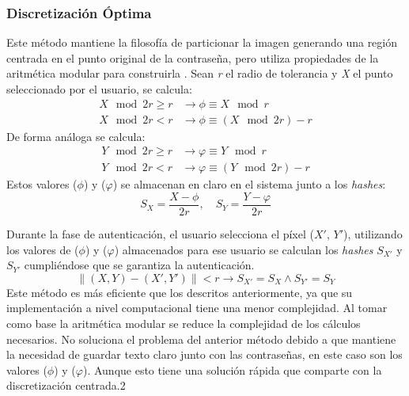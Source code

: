 \subsubsection{Discretización Óptima}
	
Este método mantiene la filosofía de particionar la imagen generando una región centrada en el punto original de la contraseña, pero utiliza propiedades de la aritmética modular para construirla \cite{bicakci2008optimal}. Sean \textit{r} el radio de tolerancia y \textit{X} el punto seleccionado por el usuario, se calcula:
\begin{equation}
	\begin{aligned}
		\textit{X} \mod{2r} \geq r &\rightarrow \phi \equiv X \mod{r} \\
		\textit{X} \mod{2r} < r &\rightarrow \phi \equiv (X \mod{2r}) - r
	\end{aligned}
	\label{eq:phi}
\end{equation}
De forma análoga se calcula:
\begin{equation}
	\begin{aligned}
		\textit{Y} \mod{2r} \geq r &\rightarrow \varphi \equiv Y \mod{r} \\
		\textit{Y} \mod{2r} < r &\rightarrow \varphi \equiv (Y \mod{2r}) - r
	\end{aligned}
	\label{eq:varphi}
\end{equation}
Estos valores (\(\phi\)) y (\(\varphi\)) se almacenan en claro en el sistema junto a los \textit{hashes}:
\begin{equation}
	S_X = \frac{X - \phi}{2r}, \quad S_Y = \frac{Y - \varphi}{2r} \label{eq:hashes}
\end{equation}

Durante la fase de autenticación, el usuario selecciona el píxel ($X'$, $Y'$), utilizando los valores de (\(\phi\)) y (\(\varphi\)) almacenados para ese usuario se calculan los \textit{hashes} \(S_{X'}\) y \(S_{Y'}\) cumpliéndose que se garantiza la autenticación.
\begin{equation}
	\|(X, Y) - (X', Y')\| < r \rightarrow S_{X'} = S_X \land S_{Y'} = S_Y \label{eq:autenticacion}
\end{equation}
Este método es más eficiente que los descritos anteriormente, ya que su implementación a nivel computacional tiene una menor complejidad. Al tomar como base la aritmética modular se reduce la complejidad de los cálculos necesarios. No soluciona el problema del anterior método debido a que mantiene la necesidad de guardar texto claro junto con  las  contraseñas,  en  este  caso  son  los  valores   ($\phi$)  y  ($\varphi$).  Aunque  esto tiene  una  solución  rápida  que comparte con la discretización centrada.2

